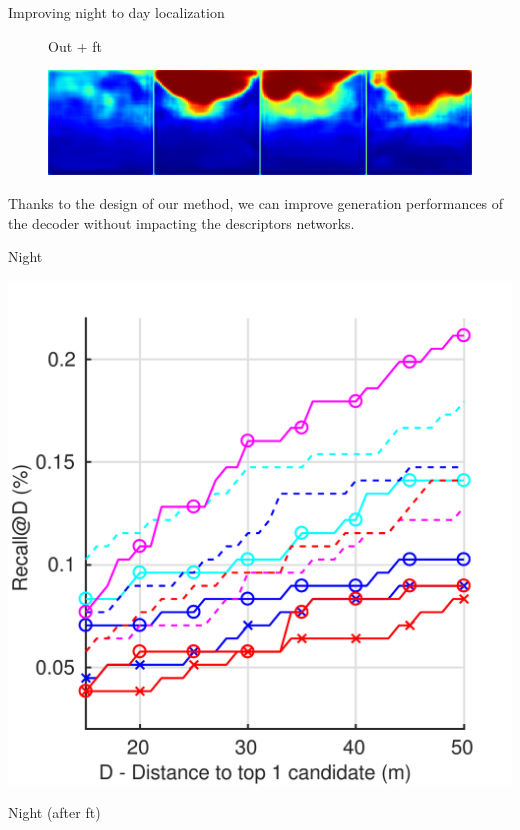 \documentclass[final]{beamer}
\newlength{\colwidth}
\begin{document}
\begin{frame}[t]
\begin{columns}[t]
\begin{column}{\colwidth}
\begin{block}{Improving night to day localization}
\begin{figure}
		\vspace{-0.5cm}
		\begin{minipage}{0.15\linewidth}
			\raggedright \footnotesize
   			Out + ft
		\end{minipage}
		\begin{minipage}{0.7\linewidth}
			\includegraphics[width=\linewidth]{im/res/night_ft}
		\end{minipage}
    \end{figure}
    
	 Thanks to the design of our method, we can improve generation performances of the decoder without impacting the descriptors networks.
  
      \begin{minipage}{0.49\linewidth}
	  		\centering
	  		Night
	  		
			\includegraphics[width=\linewidth]{vect/res/night}
		\end{minipage}\hfill
		\begin{minipage}{0.49\linewidth}
	  		\centering
			Night (after ft)
			

\end{minipage}
\end{block}
\end{column}
\end{columns}
\end{frame}
\end{document}
